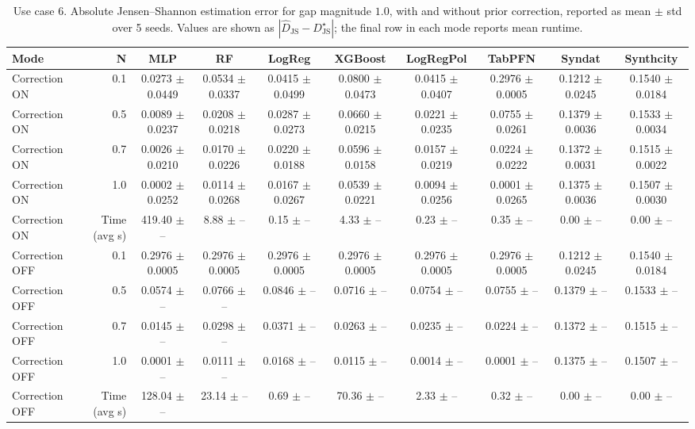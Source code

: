 \begin{table}[ht]
\centering
\small
\setlength{\tabcolsep}{3pt}
\caption{Use case 6. Absolute Jensen--Shannon estimation error for gap magnitude $1.0$, with and without prior correction, reported as mean $\pm$ std over 5 seeds. Values are shown as $|\widehat{D}_{\mathrm{JS}} - D_{\mathrm{JS}}^{\star}|$; the final row in each mode reports mean runtime.}
\label{tab:uc6_gap_1p0_on_off_mean_std}
\begin{tabular}{lrcccccccc}
\toprule
Mode & N & MLP & RF & LogReg & XGBoost & LogRegPol & TabPFN & Syndat & Synthcity \\
\midrule
Correction ON & 0.1 & 0.0273 $\pm$ 0.0449 & 0.0534 $\pm$ 0.0337 & 0.0415 $\pm$ 0.0499 & 0.0800 $\pm$ 0.0473 & 0.0415 $\pm$ 0.0407 & 0.2976 $\pm$ 0.0005 & 0.1212 $\pm$ 0.0245 & 0.1540 $\pm$ 0.0184 \\
Correction ON & 0.5 & 0.0089 $\pm$ 0.0237 & 0.0208 $\pm$ 0.0218 & 0.0287 $\pm$ 0.0273 & 0.0660 $\pm$ 0.0215 & 0.0221 $\pm$ 0.0235 & 0.0755 $\pm$ 0.0261 & 0.1379 $\pm$ 0.0036 & 0.1533 $\pm$ 0.0034 \\
Correction ON & 0.7 & 0.0026 $\pm$ 0.0210 & 0.0170 $\pm$ 0.0226 & 0.0220 $\pm$ 0.0188 & 0.0596 $\pm$ 0.0158 & 0.0157 $\pm$ 0.0219 & 0.0224 $\pm$ 0.0222 & 0.1372 $\pm$ 0.0031 & 0.1515 $\pm$ 0.0022 \\
Correction ON & 1.0 & 0.0002 $\pm$ 0.0252 & 0.0114 $\pm$ 0.0268 & 0.0167 $\pm$ 0.0267 & 0.0539 $\pm$ 0.0221 & 0.0094 $\pm$ 0.0256 & 0.0001 $\pm$ 0.0265 & 0.1375 $\pm$ 0.0036 & 0.1507 $\pm$ 0.0030 \\
Correction ON & Time (avg s) & 419.40 $\pm$ -- & 8.88 $\pm$ -- & 0.15 $\pm$ -- & 4.33 $\pm$ -- & 0.23 $\pm$ -- & 0.35 $\pm$ -- & 0.00 $\pm$ -- & 0.00 $\pm$ -- \\
Correction OFF & 0.1 & 0.2976 $\pm$ 0.0005 & 0.2976 $\pm$ 0.0005 & 0.2976 $\pm$ 0.0005 & 0.2976 $\pm$ 0.0005 & 0.2976 $\pm$ 0.0005 & 0.2976 $\pm$ 0.0005 & 0.1212 $\pm$ 0.0245 & 0.1540 $\pm$ 0.0184 \\
Correction OFF & 0.5 & 0.0574 $\pm$ -- & 0.0766 $\pm$ -- & 0.0846 $\pm$ -- & 0.0716 $\pm$ -- & 0.0754 $\pm$ -- & 0.0755 $\pm$ -- & 0.1379 $\pm$ -- & 0.1533 $\pm$ -- \\
Correction OFF & 0.7 & 0.0145 $\pm$ -- & 0.0298 $\pm$ -- & 0.0371 $\pm$ -- & 0.0263 $\pm$ -- & 0.0235 $\pm$ -- & 0.0224 $\pm$ -- & 0.1372 $\pm$ -- & 0.1515 $\pm$ -- \\
Correction OFF & 1.0 & 0.0001 $\pm$ -- & 0.0111 $\pm$ -- & 0.0168 $\pm$ -- & 0.0115 $\pm$ -- & 0.0014 $\pm$ -- & 0.0001 $\pm$ -- & 0.1375 $\pm$ -- & 0.1507 $\pm$ -- \\
Correction OFF & Time (avg s) & 128.04 $\pm$ -- & 23.14 $\pm$ -- & 0.69 $\pm$ -- & 70.36 $\pm$ -- & 2.33 $\pm$ -- & 0.32 $\pm$ -- & 0.00 $\pm$ -- & 0.00 $\pm$ -- \\
\bottomrule
\end{tabular}
\end{table}